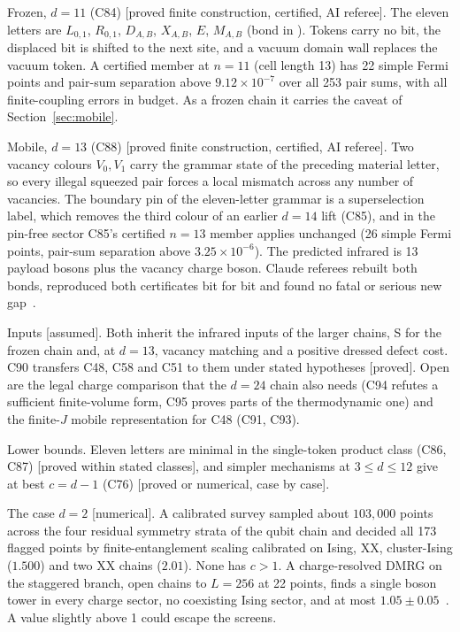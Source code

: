 \documentclass[11pt]{article}
\theoremstyle{definition}
\newcommand{\st}[1]{\textup{[\textsf{#1}]}}
\begin{document}
Frozen, $d=11$ (C84) \st{proved finite construction, certified, AI referee}. The eleven letters are $L_{0,1}$, $R_{0,1}$, $D_{A,B}$, $X_{A,B}$, $E$, $M_{A,B}$ (bond in ). Tokens carry no bit, the displaced bit is shifted to the next site, and a vacuum domain wall replaces the vacuum token. A certified member at $n=11$ (cell length 13) has 22 simple Fermi points and pair-sum separation above $9.12\times10^{-7}$ over all 253 pair sums, with all finite-coupling errors in budget. As a frozen chain it carries the caveat of Section~\ref{sec:mobile}.

Mobile, $d=13$ (C88) \st{proved finite construction, certified, AI referee}. Two vacancy colours $V_0,V_1$ carry the grammar state of the preceding material letter, so every illegal squeezed pair forces a local mismatch across any number of vacancies. The boundary pin of the eleven-letter grammar is a superselection label, which removes the third colour of an earlier $d=14$ lift (C85), and in the pin-free sector C85's certified $n=13$ member applies unchanged (26 simple Fermi points, pair-sum separation above $3.25\times10^{-6}$). The predicted infrared is 13 payload bosons plus the vacancy charge boson. Claude referees rebuilt both bonds, reproduced both certificates bit for bit and found no fatal or serious new gap~\cite{refC84}.

Inputs \st{assumed}. Both inherit the infrared inputs of the larger chains, S for the frozen chain and, at $d=13$, vacancy matching and a positive dressed defect cost. C90 transfers C48, C58 and C51 to them under stated hypotheses \st{proved}. Open are the legal charge comparison that the $d=24$ chain also needs (C94 refutes a sufficient finite-volume form, C95 proves parts of the thermodynamic one) and the finite-$J$ mobile representation for C48 (C91, C93).

Lower bounds. Eleven letters are minimal in the single-token product class (C86, C87) \st{proved within stated classes}, and simpler mechanisms at $3\le d\le12$ give at best $c=d-1$ (C76) \st{proved or numerical, case by case}.

The case $d=2$ \st{numerical}. A calibrated survey sampled about $103{,}000$ points across the four residual symmetry strata of the qubit chain and decided all 173 flagged points by finite-entanglement scaling calibrated on Ising, XX, cluster-Ising ($1.500$) and two XX chains ($2.01$). None has $c>1$. A charge-resolved DMRG on the staggered branch, open chains to $L=256$ at 22 points, finds a single boson tower in every charge sector, no coexisting Ising sector, and at most $1.05\pm0.05$~\cite{d2grid}. A value slightly above 1 could escape the screens.
\end{document}
